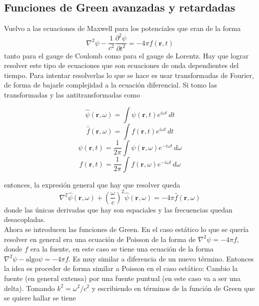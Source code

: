 \subsection{Funciones de Green avanzadas y retardadas}
Vuelvo a las ecuaciones de Maxwell para los potenciales que eran de la forma
\begin{equation*}
    \nabla^{2}\psi- \frac{1}{c^{2}}\frac{\partial^{2}\psi}{\partial t^{2}} = -4\pi f(\textbf{r},t)
\end{equation*}
tanto para el gauge de Coulomb como para el gauge de Lorentz. Hay que lograr resolver este tipo de ecuaciones que son ecuaciones de onda dependientes del tiempo. Para intentar resolverlas lo que se hace es usar transformadas de Fourier, de forma de bajarle complejidad a la ecuación diferencial. Si tomo las transformadas y las antitransformadas como
\begin{multicols}{2}
\begin{equation*}
    \hat{\psi}(\textbf{r},\omega) = \int\psi(\textbf{r},t)e^{i\omega t}\,dt
\end{equation*}
\begin{equation*}
    \hat{f}(\textbf{r},\omega) = \int f(\textbf{r},t)e^{i\omega t}\,dt
\end{equation*}
\begin{equation*}
    \psi(\textbf{r},t) = \frac{1}{2\pi} \int\psi(\textbf{r},\omega)e^{-i\omega t}\,d\omega
\end{equation*}
\begin{equation*}
    f(\textbf{r},t) = 
    \frac{1}{2\pi}
    \int f(\textbf{r},\omega)e^{-i\omega t}\,d\omega
\end{equation*}
\end{multicols}
entonces, la expresión general que hay que resolver queda
\begin{equation*}
    \nabla^{2}\hat{\psi}(\textbf{r},\omega) +             \left(    
        \frac{\omega}{c}
    \right)^{2}\hat{\psi}(\textbf{r},\omega)
    = -4\pi\hat{f}(\textbf{r},\omega)
\end{equation*}
donde las únicas derivadas que hay son espaciales y las frecuencias quedan desacopladas.\\
\indent Ahora se introducen las funciones de Green. En el caso estático lo que se quería resolver en general era una ecuación de Poisson de la forma de $\nabla^{2}\psi = -4\pi f$, donde $f$ era la fuente, en este caso se tiene una ecuación de la forma $\nabla^{2}\psi - \mbox{algo}\psi = - 4\pi f$. Es muy similar a diferencia de un nuevo término. Entonces la idea es proceder de forma similar a Poisson en el caso estático: Cambio la fuente (en general extensa) por una fuente puntual (en este caso va a ser una delta). Tomando $k^{2} = \omega^{2}/c^{2}$ y escribiendo en términos de la función de Green que se quiere hallar se tiene
